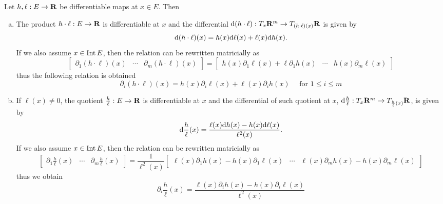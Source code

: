 \begin{theorem}\label{thm: diff-prod-div}
  Let \(h, \ell: E \to \mathbf{R}\) be differentiable maps at \(x \in E\). Then
  \begin{enumerate}[(a)]
    \item The product \(h \cdot \ell: E \to \mathbf{R}\) is differentiable at \(x\) and
      the differential \(\mathrm{d}(h \cdot \ell): T_x\mathbf{R}^m \to T_{(h \cdot
      \ell)(x)}\mathbf{R}\) is given by
      \begin{equation}
        \mathrm{d}(h \cdot \ell)(x) = h(x) \mathrm{d} \ell(x) + \ell(x) \mathrm{d} h(x).
      \end{equation}
      If we also assume \(x \in \operatorname{Int} E\), then the relation can be rewritten
      matricially as
      \[
        \begin{bmatrix}
          \partial_1 (h \cdot \ell)(x) &\cdots &\partial_m (h \cdot \ell)(x)
        \end{bmatrix}
        =
        \begin{bmatrix}
          h(x) \partial_1 \ell(x) + \ell \partial_1 h(x)
          &\cdots
          &h(x) \partial_m \ell(x)
        \end{bmatrix}
      \]
      thus the following relation is obtained
      \begin{equation}
        \partial_i (h \cdot \ell)(x) =
        h(x) \partial_i \ell(x) + \ell(x) \partial_i h(x)
        \quad \text{ for } 1 \leq i \leq m
      \end{equation}
    \item If \(\ell(x) \neq 0\), the quotient \(\frac h \ell: E \to \mathbf{R}\) is
      differentiable at \(x\) and the differential of such quotient at \(x\),
      \(\mathrm{d} \frac h \ell: T_x\mathbf{R}^m \to T_{\frac h \ell (x)}\mathbf{R}\), is given by
      \begin{equation}
        \mathrm{d} \frac h \ell (x) =
        \frac{\ell(x) \mathrm{d} h(x) - h(x) \mathrm{d} \ell(x)}{\ell^2(x)}.
      \end{equation}
      If we also assume \(x \in \operatorname{Int} E\), then the relation can be rewritten
      matricially as
      {\small%
      \[
        \begin{bmatrix}
          \partial_1 \frac h \ell (x) &\cdots &\partial_m \frac h \ell (x)
        \end{bmatrix}
        =
        \frac 1 {\ell^2(x)}
        \begin{bmatrix}
        \ell(x) \partial_1 h(x) - h(x) \partial_1 \ell(x)
        &\cdots
        &\ell(x) \partial_m h(x) - h(x) \partial_m \ell(x)
        \end{bmatrix}
      \]
      }%
      thus we obtain
      \begin{equation}
        \partial_i \frac h \ell (x) =
        \frac{\ell(x) \partial_i h(x) - h(x) \partial_i \ell(x)}{\ell^2(x)}
      \end{equation}
  \end{enumerate}
\end{theorem}

